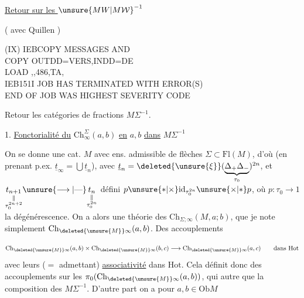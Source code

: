\uline{Retour sur les $\unsure{MW|M\mathcal W}^{-1}$}

( avec Quillen )

(IX)
{\ttfamily IEBCOPY MESSAGES AND \\
COPY OUTDD=VERS,INDD=DE\\
  LOAD \unsure{-}  ,,486,TA,\\
IEB151I JOB HAS TERMINATED WITH ERROR(S)\\
 END OF JOB WAS HIGHEST SEVERITY CODE}

 Retour  les catégories de fractions $M\Sigma^{-1}$.

1. \uline{Fonctorialité du} $\mathrm{Ch}^{\Sigma}_{\infty}(a,b)$ \uline{en} $a,b$ \uline{dans} $M\Sigma^{-1}$

On se donne une cat. $M$ avec ens. admissible de flèches $\Sigma\subset\mathrm{Fl}(M)$, d'où (en prenant p.ex. $\underline t_{\infty}=\bigcup\underline t_n$), avec $\underline t_n=\deleted{\unsure{\xi}}(\underbrace{\Delta_+\Delta_-}_{\tau_0})^{2n}$, et $\underset{\substack{\Vert\\\tau_0^{2n+2}}}{t_{n+1}}\unsure{\longrightarrow|\text{---}}\underset{\substack{\Vert\\\tau_0^{2n}}}{t_n}$ défini   $p\unsure{*|\times}\mathrm{id}_{\tau_0^{2n}}\unsure{\times|*}p$, où $p:\tau_0\to1$ la dégénérescence. On a alors une théorie des $\mathrm{Ch}_{\Sigma;\infty}(M,a;b)$, que je note simplement $\mathrm{Ch}_{\deleted{\unsure{M}}\infty}(a,b)$. Des  accouplements

\[
\mathrm{Ch}_{\deleted{\unsure{M}}\infty}(a,b)\times\mathrm{Ch}_{\deleted{\unsure{M}}\infty}(b,c)\longrightarrow\mathrm{Ch}_{\deleted{\unsure{M}}\infty}(a,c)\qquad\text{dans }\mathrm{Hot}
\]
avec leurs  ($=$ admettant) \uline{associativité}  dans $\mathrm{Hot}$.  Cela définit donc des accouplements sur les $\pi_0(\mathrm{Ch}_{\deleted{\unsure{M}}\infty}(a,b))$, qui  autre que la composition des   $M\Sigma^{-1}$. D'autre part on a pour $a,b\in\mathrm{Ob}M$

